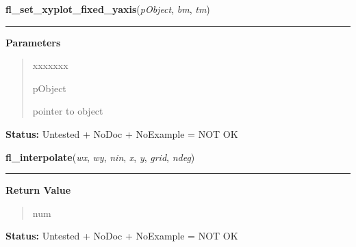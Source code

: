 \hspace{.8\funcindent}\begin{boxedminipage}{\funcwidth}

    \raggedright \textbf{fl\_set\_xyplot\_fixed\_yaxis}(\textit{pObject}, \textit{bm}, \textit{tm})

    \vspace{-1.5ex}

    \rule{\textwidth}{0.5\fboxrule}
\setlength{\parskip}{2ex}
\setlength{\parskip}{1ex}
      \textbf{Parameters}
      \vspace{-1ex}

      \begin{quote}
        \begin{Ventry}{xxxxxxx}

          \item[pObject]

          pointer to object

        \end{Ventry}

      \end{quote}

\textbf{Status:} Untested + NoDoc + NoExample = NOT OK



    \end{boxedminipage}

    \label{xformslib:library:fl_interpolate}

    \vspace{0.5ex}

\hspace{.8\funcindent}\begin{boxedminipage}{\funcwidth}

    \raggedright \textbf{fl\_interpolate}(\textit{wx}, \textit{wy}, \textit{nin}, \textit{x}, \textit{y}, \textit{grid}, \textit{ndeg})

    \vspace{-1.5ex}

    \rule{\textwidth}{0.5\fboxrule}
\setlength{\parskip}{2ex}
\setlength{\parskip}{1ex}
      \textbf{Return Value}
    \vspace{-1ex}

      \begin{quote}
      num

      \end{quote}

\textbf{Status:} Untested + NoDoc + NoExample = NOT OK



    \end{boxedminipage}

